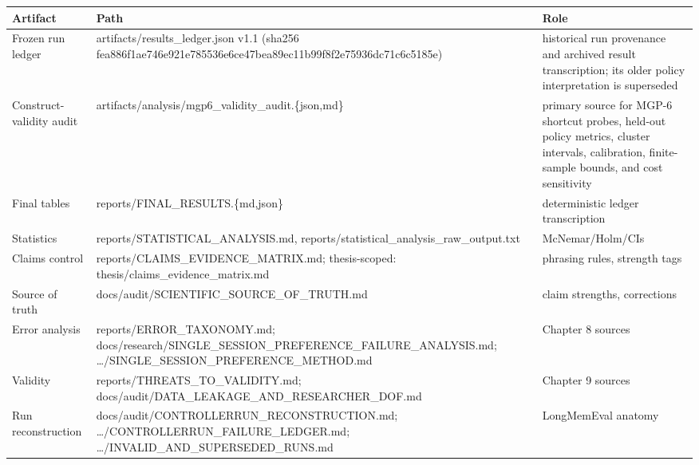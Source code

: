 {\def\LTcaptype{none} %
\begin{longtable}[]{@{}
  >{\raggedright\arraybackslash}p{}
  >{\raggedright\arraybackslash}p{}
  >{\raggedright\arraybackslash}p{}@{}}
\toprule\noalign{}
\begin{minipage}[b]{\linewidth}\raggedright
\textbf{Artifact}
\end{minipage} & \begin{minipage}[b]{\linewidth}\centering
\textbf{Path}
\end{minipage} & \begin{minipage}[b]{\linewidth}\centering
\textbf{Role}
\end{minipage} \\
\midrule\noalign{}
\endhead
\bottomrule\noalign{}
\endlastfoot
Frozen run ledger & artifacts/results\_ledger.json v1.1 (sha256
fea886f1ae746e921e785536e6ce47bea89ec11b99f8f2e75936dc71c6c5185e) &
historical run provenance and archived result transcription; its older
policy interpretation is superseded \\
Construct-validity audit &
artifacts/analysis/mgp6\_validity\_audit.\{json,md\} & primary source
for MGP-6 shortcut probes, held-out policy metrics, cluster intervals,
calibration, finite-sample bounds, and cost sensitivity \\
Final tables & reports/FINAL\_RESULTS.\{md,json\} & deterministic ledger
transcription \\
Statistics & reports/STATISTICAL\_ANALYSIS.md,
reports/statistical\_analysis\_raw\_output.txt & McNemar/Holm/CIs \\
Claims control & reports/CLAIMS\_EVIDENCE\_MATRIX.md; thesis-scoped:
thesis/claims\_evidence\_matrix.md & phrasing rules, strength tags \\
Source of truth & docs/audit/SCIENTIFIC\_SOURCE\_OF\_TRUTH.md & claim
strengths, corrections \\
Error analysis & reports/ERROR\_TAXONOMY.md;
docs/research/SINGLE\_SESSION\_PREFERENCE\_FAILURE\_ANALYSIS.md;
\ldots/SINGLE\_SESSION\_PREFERENCE\_METHOD.md & Chapter 8 sources \\
Validity & reports/THREATS\_TO\_VALIDITY.md;
docs/audit/DATA\_LEAKAGE\_AND\_RESEARCHER\_DOF.md & Chapter 9 sources \\
Run reconstruction & docs/audit/CONTROLLERRUN\_RECONSTRUCTION.md;
\ldots/CONTROLLERRUN\_FAILURE\_LEDGER.md;
\ldots/INVALID\_AND\_SUPERSEDED\_RUNS.md & LongMemEval anatomy \\

\end{longtable}}
